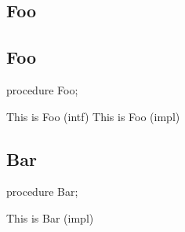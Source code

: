 \documentclass{report}
\newif\ifpdf
\begin{document}
\subsection*{\large{\textbf{Foo}}\normalsize\hspace{1ex}\hrulefill}
\else
\subsection*{Foo}
\fi
\label{ok_parse_impl-Foo}
\begin{list}{}{
\setlength{\itemindent}{0cm}
\setlength{\listparindent}{0cm}
\setlength{\leftmargin}{\evensidemargin}
\addtolength{\leftmargin}{\tmplength}
\settowidth{\labelsep}{X}
\addtolength{\leftmargin}{\labelsep}
\setlength{\labelwidth}{\tmplength}
}
\item[\textbf{Declaration}\hfill]
\ifpdf
\begin{flushleft}
\fi
\begin{ttfamily}
procedure Foo;\end{ttfamily}

\ifpdf
\end{flushleft}
\fi

\par
\item[\textbf{Description}]
This is Foo (intf) This is Foo (impl)

\end{list}
\ifpdf
\subsection*{\large{\textbf{Bar}}\normalsize\hspace{1ex}\hrulefill}
\else
\subsection*{Bar}
\fi
\label{ok_parse_impl-Bar}
\begin{list}{}{
\setlength{\itemindent}{0cm}
\setlength{\listparindent}{0cm}
\setlength{\leftmargin}{\evensidemargin}
\addtolength{\leftmargin}{\tmplength}
\settowidth{\labelsep}{X}
\addtolength{\leftmargin}{\labelsep}
\setlength{\labelwidth}{\tmplength}
}
\item[\textbf{Declaration}\hfill]
\ifpdf
\begin{flushleft}
\fi
\begin{ttfamily}
procedure Bar;\end{ttfamily}

\ifpdf
\end{flushleft}
\fi

\par
\item[\textbf{Description}]
This is Bar (impl)

\end{list}
\ifpdf
\end{document}
